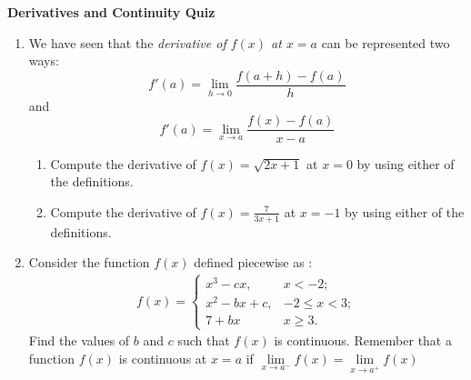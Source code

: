 \documentclass[11pt]{article}
\begin{document}

\centerline{\textbf{\Large{Derivatives and Continuity Quiz}}}

\vspace{0.2in}
 

\begin{enumerate}

\item We have seen that the {\em derivative of $f(x)$ at $x=a$} can be represented two ways: \[f'(a)=\lim_{h\rightarrow 0}\frac{f(a+h)-f(a)}{h}\] and \[f'(a)=\lim_{x\rightarrow a}\frac{f(x)-f(a)}{x-a}\]

\begin{enumerate}
	\item Compute the derivative of $f(x) = \sqrt{2x+1}$ at $x = 0$ by using either of the definitions.
	\item Compute the derivative of $f(x) = \frac{7}{3x+1}$ at $x = -1$ by using either of the definitions.
\end{enumerate}

\newpage
\item Consider the function $f(x)$ defined piecewise as :
\begin{align*}
	f(x)=\begin{cases} x^3-cx, & x < -2; \\ 
						x^2 - bx + c, & -2\leq x < 3; \\
					    7 + bx & x \geq 3. \end{cases}
\end{align*}
Find the values of $b$ and $c$ such that $f(x)$ is continuous. Remember that a function $f(x)$ is continuous at $x = a$ if $\lim\limits_{x \to a^{-}} f(x) = \lim\limits_{x \to a^{+}} f(x)$
 




\end{enumerate}
\end{document}
